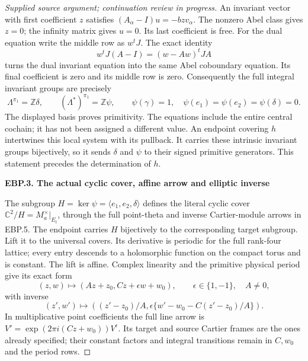 \begin{proof}[Supplied source argument; continuation review in progress]
An invariant vector with first coefficient \(z\) satisfies
\((A_\alpha-I)u=-bzv_\alpha\). The nonzero Abel class gives
\(z=0\); the infinity matrix gives \(u=0\). Its last coefficient
is free. For the dual equation write the middle row as \(w^tJ\).
The exact identity
\[
 w^tJ(A-I)=(w-Aw)^tJA
 \tag{EBP.8}
\]
turns the dual invariant equation into the same Abel coboundary
equation. Its final coefficient is zero and its middle row is zero.
Consequently the full integral invariant groups are precisely
\[
 \Lambda^{\pi_1}=\mathbb Z\delta,
 \qquad (\Lambda^*)^{\pi_1}=\mathbb Z\psi,
 \qquad\psi(\gamma)=1,
 \quad\psi(e_1)=\psi(e_2)=\psi(\delta)=0.
 \tag{EBP.9}
\]
The displayed basis proves primitivity. The equations include the entire
central cochain; it has not been assigned a different value.
An endpoint covering \(h\) intertwines this local system with its
pullback. It carries these intrinsic invariant groups bijectively,
so it sends \(\delta\) and \(\psi\) to their signed primitive
generators. This statement precedes the determination of \(h\).

\par

\medskip\noindent\textbf{EBP.3. The actual cyclic cover, affine arrow and elliptic inverse}

\par\nobreak

The subgroup
\(H=\ker\psi=\langle e_1,e_2,\delta\rangle\) defines the
literal cyclic cover \(\mathbb C^2/H=M_a^\times|_{E_t}\), through
the full point-theta and inverse Cartier-module arrows in EBP.5.
The endpoint carries \(H\) bijectively to the corresponding target
subgroup. Lift it to the universal covers. Its derivative is periodic
for the full rank-four lattice; every entry descends to a holomorphic
function on the compact torus and is constant. The lift is affine.
Complex linearity and the primitive physical period give its exact form
\[
 (z,w)\longmapsto(Az+z_0,Cz+\epsilon w+w_0),\qquad
 \epsilon\in\{1,-1\},\quad A\ne0,
 \tag{EBP.10}
\]
with inverse
\[
 (z',w')\longmapsto
 \left((z'-z_0)/A,
 \epsilon\{w'-w_0-C(z'-z_0)/A\}\right).
 \tag{EBP.11}
\]
In multiplicative point coefficients the full line arrow is
\(V'=\exp(2\pi i(Cz+w_0))V^\epsilon\). Its target and source
Cartier frames are the ones already specified; their constant factors
and integral transitions remain in \(C,w_0\) and the period rows.


\end{proof}
